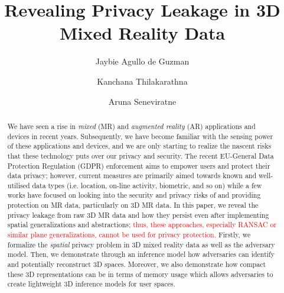 \documentclass[sigconf, anonymous]{acmart} %
\begin{document}
	

\title{Revealing Privacy Leakage in 3D Mixed Reality Data}

\author{Jaybie Agullo de Guzman}

\author{Kanchana Thilakarathna}

\author{Aruna Seneviratne}

\renewcommand{\shortauthors}{J. de Guzman, K. Thilakarathna, \& A. Seneviratne}


\begin{abstract}
We have seen a rise in \textit{mixed} (MR) and \textit{augmented reality} (AR) applications and devices in recent years. Subsequently, we have become familiar with the sensing power of these applications and devices, and we are only starting to realize the nascent risks that these technology puts over our privacy and security. The recent EU-General Data Protection Regulation (GDPR) enforcement aims to empower users and protect their data privacy; however, current measures are primarily aimed towards known and well-utilised data types (i.e. location, on-line activity, biometric, and so on) while a few works have focused on looking into the security and privacy risks of and providing protection on MR data, particularly on 3D MR data. In this paper, we reveal the privacy leakage from raw 3D MR data and how they persist even after implementing spatial generalizations and abstractions; \textcolor{red}{thus, these approaches, especially RANSAC or similar plane generalizations, cannot be used for privacy protection.} Firstly, we formalize the \textit{spatial} privacy problem in 3D mixed reality data as well as the adversary model. Then, we demonstrate through an inference model how adversaries can identify and potentially reconstruct 3D spaces. Moreover, we also demonstrate how compact these 3D representations can be in terms of memory usage which allows adversaries to create lightweight 3D inference models for user spaces.%
\end{abstract}
\end{document}
